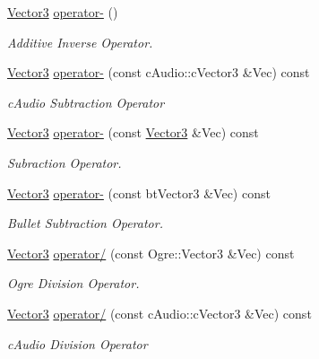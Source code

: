 \begin{DoxyCompactItemize}
\hyperlink{classphys_1_1Vector3}{Vector3} \hyperlink{classphys_1_1Vector3_afb86ac7edd78353ec3d11d9f2efdf0cb}{operator-\/} ()
\begin{DoxyCompactList}\small\item\em Additive Inverse Operator. \item\end{DoxyCompactList}\item 
\hyperlink{classphys_1_1Vector3}{Vector3} \hyperlink{classphys_1_1Vector3_a84bcf6d8e0c850e32c642f1b634d38e9}{operator-\/} (const cAudio::cVector3 \&Vec) const 
\begin{DoxyCompactList}\small\item\em cAudio Subtraction Operator \item\end{DoxyCompactList}\item 
\hyperlink{classphys_1_1Vector3}{Vector3} \hyperlink{classphys_1_1Vector3_a8dd6dad4d32d2c7045a31e8fbdc16b8f}{operator-\/} (const \hyperlink{classphys_1_1Vector3}{Vector3} \&Vec) const 
\begin{DoxyCompactList}\small\item\em Subraction Operator. \item\end{DoxyCompactList}\item 
\hyperlink{classphys_1_1Vector3}{Vector3} \hyperlink{classphys_1_1Vector3_affbba2c1aa5dd5cd788f4f7e440cd52e}{operator-\/} (const btVector3 \&Vec) const 
\begin{DoxyCompactList}\small\item\em Bullet Subtraction Operator. \item\end{DoxyCompactList}\item 
\hyperlink{classphys_1_1Vector3}{Vector3} \hyperlink{classphys_1_1Vector3_afadb345e180a9be607ec33de68c7a71b}{operator/} (const Ogre::Vector3 \&Vec) const 
\begin{DoxyCompactList}\small\item\em Ogre Division Operator. \item\end{DoxyCompactList}\item 
\hyperlink{classphys_1_1Vector3}{Vector3} \hyperlink{classphys_1_1Vector3_ad2e1c9f24ea2127380e772058a91130c}{operator/} (const cAudio::cVector3 \&Vec) const 
\begin{DoxyCompactList}\small\item\em cAudio Division Operator \item\end{DoxyCompactList}\item 

\end{DoxyCompactItemize}
